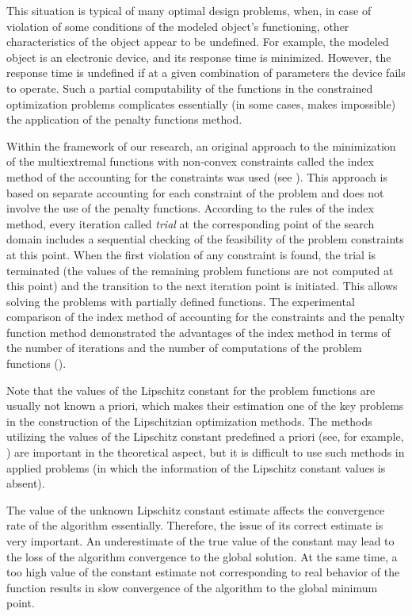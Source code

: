 \documentclass[twocolumn]{svjour3}          %
\begin{document}
	This situation is typical of many optimal design problems, when, in case of violation of some conditions of the modeled object's functioning, other characteristics of the object appear to be undefined. For example, the modeled object is an electronic device, and its response time is minimized. However, the response time is undefined if at a given combination of parameters the device fails to operate. Such a partial computability of the functions in the constrained optimization problems complicates essentially (in some cases, makes impossible) the application of the penalty functions method. 
	
	Within the framework of our research, an original approach to the minimization of the multiextremal functions with non-convex constraints called the index method of the accounting for the constraints  
was used (see \cite{Strongin2000,Pugliese,Barkalov2002,Strongin2003}). This approach is based on separate accounting for each constraint of the problem and does not involve the use of the penalty functions. According to the rules of the index method, every iteration called \textit{trial} at the corresponding point of the search domain includes a sequential checking of the feasibility of the problem constraints at this point. When the first violation of any constraint is found, the trial is terminated (the values of the remaining problem functions are not computed at this point) and the transition to the next iteration point is initiated. This allows solving the problems with partially defined functions. The experimental comparison of the index method of accounting for the constraints and the penalty function method demonstrated the advantages of the index method in terms of the number of iterations and the number of computations of the problem functions (\cite{Barkalov2017_1,Barkalov2017_2}).
	
	Note that the values of the Lipschitz constant for the problem functions are usually not known a priori, which  makes their estimation one of the key problems in the construction of the Lipschitzian optimization methods. The methods utilizing the values of the Lipschitz constant predefined a priori (see, for example, \cite{Piyavskii1972,Shubert1972,Wood1991,Meewella1988,Mladineo1986}) are important in the theoretical aspect, but it is difficult to use such methods in applied problems (in which the information of the Lipschitz constant values is absent).
		
		The value of the unknown Lipschitz constant estimate affects the convergence rate of the algorithm essentially. Therefore, the issue of its correct estimate is very important. An underestimate of the true value of the constant may lead to the loss of the algorithm convergence to the global solution. At the same time, a too high value of the constant estimate not corresponding to real behavior of the function results in slow convergence of the algorithm to the global minimum point. 
		
\end{document}
